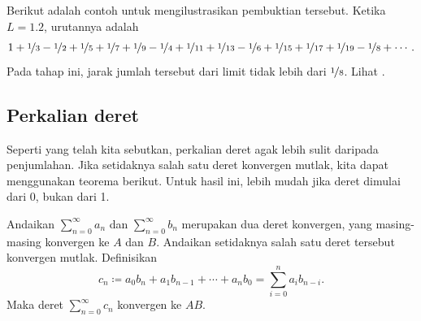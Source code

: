 \begin{example}
Berikut adalah contoh untuk mengilustrasikan pembuktian tersebut.  Ketika $L=1.2$, urutannya
adalah
\begin{equation*}
1+\nicefrac{1}{3}-\nicefrac{1}{2}+\nicefrac{1}{5}+\nicefrac{1}{7}+\nicefrac{1}{9}-\nicefrac{1}{4}+\nicefrac{1}{11}+\nicefrac{1}{13}-\nicefrac{1}{6}
+\nicefrac{1}{15}+\nicefrac{1}{17}+\nicefrac{1}{19} - \nicefrac{1}{8} + \cdots .
\end{equation*}
Pada tahap ini, jarak jumlah tersebut dari limit tidak lebih dari $\nicefrac{1}{8}$.
Lihat .
\begin{myfigureht}
\caption{Empat belas jumlah parsial pertama dari penyusunan ulang yang konvergen
ke $1.2$.\label{fig:serrearrange}}
\end{myfigureht}
\end{example}

\subsection{Perkalian deret}

Seperti yang telah
kita sebutkan,
perkalian deret agak lebih sulit daripada penjumlahan.
Jika setidaknya salah satu deret konvergen
mutlak, kita dapat menggunakan teorema berikut.  Untuk hasil ini, lebih
mudah jika deret dimulai dari 0, bukan dari 1.

\begin{thm}
Andaikan $\sum_{n=0}^\infty a_n$ dan $\sum_{n=0}^\infty b_n$ merupakan dua deret konvergen, yang masing-masing konvergen
ke $A$ dan $B$.  Andaikan setidaknya salah satu deret tersebut
konvergen mutlak.  Definisikan
\begin{equation*}
c_n \coloneqq a_0 b_n + a_1 b_{n-1} + \cdots + a_n b_0 = \sum_{i=0}^n a_i b_{n-i} .
\end{equation*}
Maka deret $\sum_{n=0}^\infty c_n$
konvergen ke $AB$.
\end{thm}

